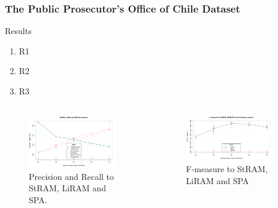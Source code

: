 \documentclass[aspectratio=169]{beamer}
\begin{document}
\begin{frame}
\frametitle{The Public Prosecutor’s Office of Chile Dataset}
\begin{block}{Results}
  \begin{enumerate}
    \item R1
    \item R2
    \item R3
  \end{enumerate}
\end{block}
\begin{columns}
  \begin{figure}[ht]
    \centering
    \includegraphics[width=0.9\textwidth]{images/comparation.pdf}
    \caption{\footnotesize Precision and Recall to StRAM, LiRAM and SPA.}
  \end{figure}
  \begin{figure}[ht]
    \centering
    \includegraphics[width=0.9\textwidth]{images/confidence-interval.pdf}
    \caption{\footnotesize F-measure to StRAM, LiRAM and SPA}
  \end{figure}
\end{columns}
\end{frame}
\end{document}

